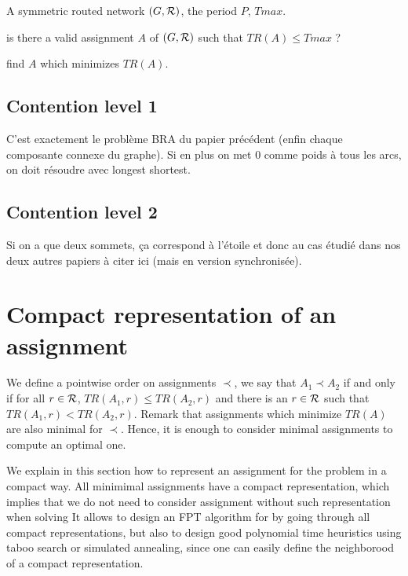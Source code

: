 \documentclass[english]{article}
\begin{document}
       

        A symmetric routed network $(G,{\cal R})$, the period $P$, $Tmax$.
      
       is there a valid assignment $A$ of $(G,{\cal R})$ such that $ TR(A) \leq Tmax$ ?

       find $A$ which minimizes $TR(A)$.
    
    

\subsection{Contention level 1}

C'est exactement le problème BRA du papier précédent (enfin chaque composante connexe du graphe).
Si en plus on met $0$ comme poids à tous les arcs, on doit résoudre avec longest shortest.

\subsection{Contention level 2}

Si on a que deux sommets, ça correspond à l'étoile et donc au cas étudié dans nos deux autres papiers à citer ici
(mais en version synchronisée). 

    

\section{Compact representation of an assignment}

 We define a pointwise order on assignments $\prec$, we say that $A_1 \prec A_2$ if and only if for all $r\in \cal{R}$, $TR(A_1,r) \leq TR(A_2,r)$ and there is an $r \in \cal {R}$ such that  $TR(A_1,r) < TR(A_2,r)$. Remark that assignments which minimize $TR(A)$ are also minimal for $\prec$. Hence, it is enough to consider minimal assignments to compute an optimal one.


We explain in this section how to represent an assignment for the problem 
\spall in a compact way. All minimimal assignments have a compact representation, which implies that we do not need to consider assignment without such representation when solving \spall
It allows to design an FPT algorithm for \spall by going through all compact representations, but also to design good polynomial time heuristics using taboo search or simulated annealing, since one can easily define the neighborood of a compact representation.
\end{document}
